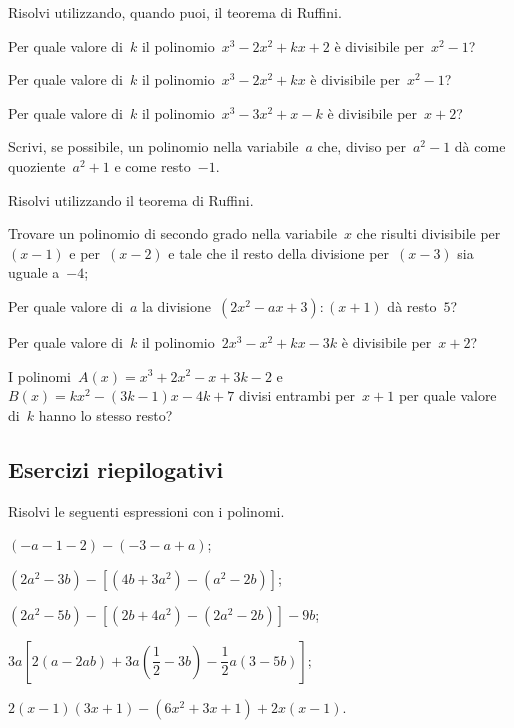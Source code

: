 \begin{esercizio}[\Ast]
\label{ese:11.40}
Risolvi utilizzando, quando puoi, il teorema di Ruffini.
 \begin{enumeratea}
 \item Per quale valore di~$k$ il polinomio~$x^{3}-2x^{2}+kx+2$ è divisibile per~$x^{2}-1$?
 \item Per quale valore di~$k$ il polinomio~$x^{3}-2x^{2}+kx$ è divisibile per~$x^{2}-1$?
 \item Per quale valore di~$k$ il polinomio~$x^{3}-3x^{2}+x-k$ è divisibile per~$x+2$?
 \item Scrivi, se possibile, un polinomio nella variabile~$a$ che, diviso per~$a^{2}-1$ dà come quoziente~$a^{2}+1$ e come resto~$-1$.
 \end{enumeratea}
\end{esercizio}

\begin{esercizio}[\Ast]
\label{ese:11.41}
Risolvi utilizzando il teorema di Ruffini.
 \begin{enumeratea}
 \item Trovare un polinomio di secondo grado nella variabile~$x$ che risulti divisibile per~$(x-1)$ e per~$(x-2)$ e tale che
     il resto della divisione per~$(x-3)$ sia uguale a~$-4$;
 \item Per quale valore di~$a$ la divisione~$\left(2x^{2}-ax+3\right):(x+1)$ dà resto~$5$?
 \item Per quale valore di~$k$ il polinomio~$2x^{3}-x^{2}+kx-3k$ è divisibile per~$x+2$?
 \item I polinomi~$A(x)=x^3+2x^2-x+3k-2$ e~$B(x)=kx^2-(3k-1)x-4k+7$ divisi entrambi per~$x+1$ per quale valore di~$k$ hanno lo stesso resto?
 \end{enumeratea}
\end{esercizio}

\subsection{Esercizi riepilogativi}

\begin{esercizio}[\Ast]
\label{ese:11.42}
Risolvi le seguenti espressioni con i polinomi.
 \begin{enumeratea}
 \item $(-a-1-2)-(-3-a+a)$;
 \item $\left(2a^{2}-3b\right)-\left[\left(4b+3a^{2}\right)-\left(a^{2}-2b\right)\right]$;
 \item $\left(2a^{2}-5b\right)-\left[\left(2b+4a^{2}\right)-\left(2a^{2}-2b\right)\right]-9b$;
 \item $3a\left[2(a-2{ab})+3a\left(\dfrac{1}{2}-3b\right)-\dfrac{1}{2}a(3-5b)\right]$;
 \item $2(x-1)(3x+1)-\left(6x^{2}+3x+1\right)+2x(x-1)$.
 \end{enumeratea}
\end{esercizio}

